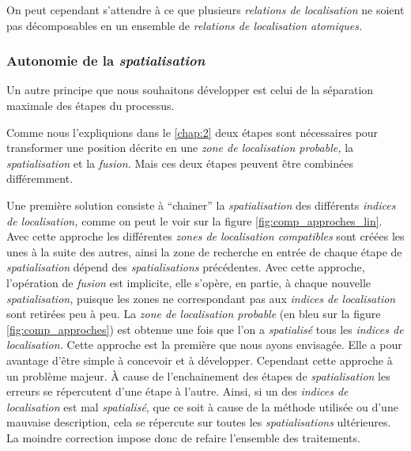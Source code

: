 On peut cependant s'attendre à ce que plusieurs \emph{relations de
  localisation} ne soient pas décomposables en un ensemble de
\emph{relations de localisation atomiques.}

\subsubsection{Autonomie de la \emph{spatialisation}}

Un autre principe que nous souhaitons développer est celui de la
séparation maximale des étapes du processus.

Comme nous l'expliquions dans le \autoref{chap:2} deux étapes sont
nécessaires pour transformer une position décrite en une \emph{zone de
  localisation probable,} la \emph{spatialisation} et la
\emph{fusion.} Mais ces deux étapes peuvent être combinées
différemment.

Une première solution consiste à \enquote{chainer} la
\emph{spatialisation} des différents \emph{indices de localisation,}
comme on peut le voir sur la figure \ref{fig:comp_approches_lin}. Avec
cette approche les différentes \emph{zones de localisation
  compatibles} sont créées les unes à la suite des autres, ainsi la
zone de recherche en entrée de chaque étape de \emph{spatialisation}
dépend des \emph{spatialisations} précédentes. Avec cette approche,
l'opération de \emph{fusion} est implicite, elle s'opère, en partie, à
chaque nouvelle \emph{spatialisation,} puisque les zones ne
correspondant pas aux \emph{indices de localisation} sont retirées peu
à peu. La \emph{zone de localisation probable} (en bleu sur la figure
\ref{fig:comp_approches}) est obtenue une fois que l'on a
\emph{spatialisé} tous les \emph{indices de localisation.} Cette
approche est la première que nous ayons envisagée. Elle a pour
avantage d'être simple à concevoir et à développer. Cependant cette
approche à un problème majeur. À cause de l'enchainement des étapes de
\emph{spatialisation} les erreurs se répercutent d'une étape à
l'autre. Ainsi, si un des \emph{indices de localisation} est mal
\emph{spatialisé}, que ce soit à cause de la méthode utilisée ou d'une
mauvaise description, cela se répercute sur toutes les
\emph{spatialisations} ultérieures. La moindre correction impose donc
de refaire l'ensemble des traitements.

